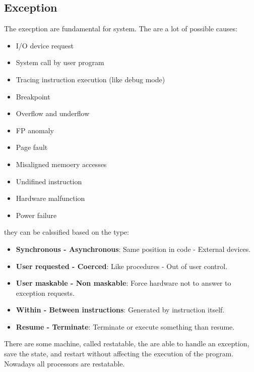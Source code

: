 \documentclass[12pt]{article}
\begin{document}
\subsection{Exception}
The execption are fundamental for system. The are a lot of possible causes:
\begin{multicols}{2}
  \begin{itemize}
    \item I/O device request
    \item System call by user program
    \item Tracing instruction execution (like debug mode)
    \item Breakpoint
    \item Overflow and underflow
    \item FP anomaly
    \item Page fault
    \item Misaligned memoery accesses
    \item Undifined instruction
    \item Hardware malfunction
    \item Power failure
  \end{itemize}
\end{multicols}
they can be calssified based on the type:
\begin{itemize}
  \item \textbf{Synchronous - Asynchronous}: Same position in code - External devices.
  \item \textbf{User requested - Coerced}: Like procedures - Out of user control.
  \item \textbf{User maskable - Non maskable}: Force hardware not to answer to exception requests.
  \item \textbf{Within - Between instructions}: Generated by instruction itself.
  \item \textbf{Resume - Terminate}: Terminate or execute something than resume.
\end{itemize}

There are some machine, called restatable, the are able to handle an exception, save the state, and restart without affecting the execution of the program. Nowadays all processors are restatable.\\
\end{document}
